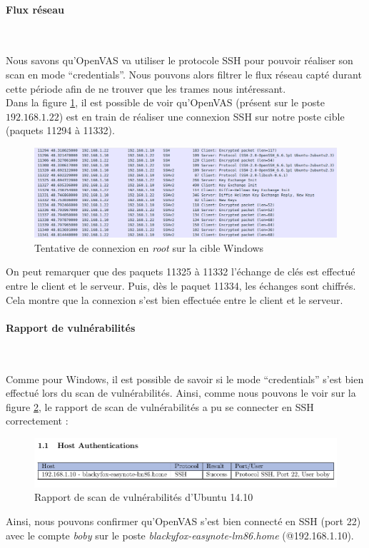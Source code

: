 \paragraph{Flux réseau}~\\\par
Nous savons qu'OpenVAS va utiliser le protocole SSH pour pouvoir réaliser son scan en mode \enquote{credentials}. Nous pouvons alors filtrer le flux réseau capté durant cette période afin de ne trouver que les trames nous intéressant.\\
Dans la figure \ref{fig:6}, il est possible de voir qu'OpenVAS (présent sur le poste $192.168.1.22$) est en train de réaliser une connexion SSH sur notre poste cible (paquets 11294 à 11332).
\begin{figure}[H]
    \centering
    \includegraphics[width=\textwidth]{img/ws5.png}
    \caption{Tentative de connexion en \textit{root} sur la cible Windows}
    \label{fig:6}
\end{figure}
On peut remarquer que des paquets 11325 à 11332 l'échange de clés est effectué entre le client et le serveur. Puis, dès le paquet 11334, les échanges sont chiffrés. Cela montre que la connexion s'est bien effectuée entre le client et le serveur.

\paragraph{Rapport de vulnérabilités}~\\\par
Comme pour Windows, il est possible de savoir si le mode \enquote{credentials} s'est bien effectué lors du scan de vulnérabilités. Ainsi, comme nous pouvons le voir sur la figure \ref{fig:7}, le rapport de scan de vulnérabilités a pu se connecter en SSH correctement :
\begin{figure}[H]
    \centering
    \includegraphics[width=\textwidth]{img/rep2.png}
    \caption{Rapport de scan de vulnérabilités d'Ubuntu 14.10}
    \label{fig:7}
\end{figure}
Ainsi, nous pouvons confirmer qu'OpenVAS s'est bien connecté en SSH (port 22) avec le compte \textit{boby} sur le poste \textit{blackyfox-easynote-lm86.home} (@192.168.1.10).